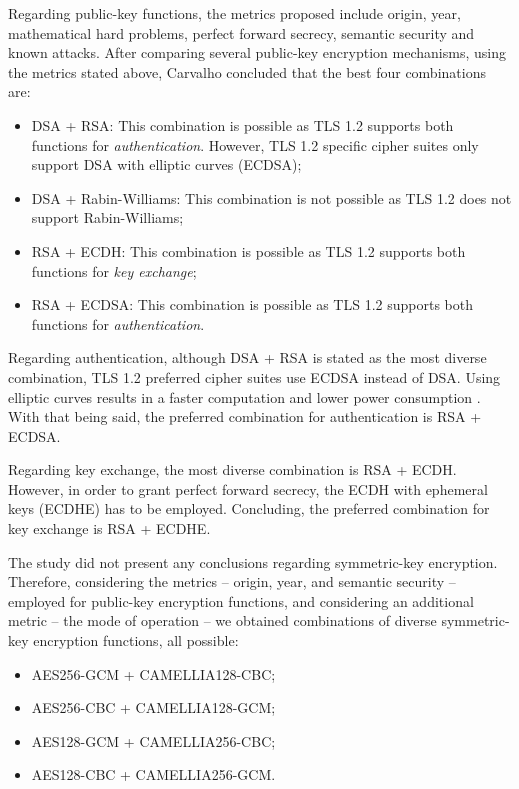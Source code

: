 \documentclass{sig-alternate-05-2015}
\begin{document}
Regarding public-key functions, the metrics proposed include origin, year, mathematical hard problems, perfect forward secrecy, semantic security and known attacks.
After comparing several public-key encryption mechanisms, using the metrics stated above, Carvalho concluded that the best four combinations are:
\begin{itemize}
\item {DSA + RSA: This combination is possible as TLS 1.2 supports both functions for \textit{authentication}. However, TLS 1.2 specific cipher suites only support DSA with elliptic curves (ECDSA);}
\item {DSA + Rabin-Williams: This combination is not possible as TLS 1.2 does not support Rabin-Williams;}
\item {RSA + ECDH: This combination is possible as TLS 1.2 supports both functions for \textit{key exchange};}
\item {RSA + ECDSA: This combination is possible as TLS 1.2 supports both functions for \textit{authentication}.}
\end{itemize}

Regarding authentication, although DSA + RSA is stated as the most diverse combination, TLS 1.2 preferred cipher suites use ECDSA instead of DSA. Using elliptic curves results in a faster computation and lower power consumption \cite{Gupta02}. With that being said, the preferred combination for authentication is RSA + ECDSA.

Regarding key exchange, the most diverse combination is RSA + ECDH. However, in order to grant perfect forward secrecy, the ECDH with ephemeral keys (ECDHE) has to be employed. Concluding, the preferred combination for key exchange is RSA + ECDHE.

The study did not present any conclusions regarding sym\-metric-key encryption. Therefore, considering the metrics -- origin, year, and semantic security -- employed for public-key encryption functions, and considering an additional metric -- the mode of operation -- we obtained combinations of diverse symmetric-key encryption functions, all possible:
\begin{itemize}
\item {AES256-GCM + CAMELLIA128-CBC;}
\item {AES256-CBC + CAMELLIA128-GCM;}
\item {AES128-GCM + CAMELLIA256-CBC;}
\item {AES128-CBC + CAMELLIA256-GCM.}
\end{itemize}
\end{document}
